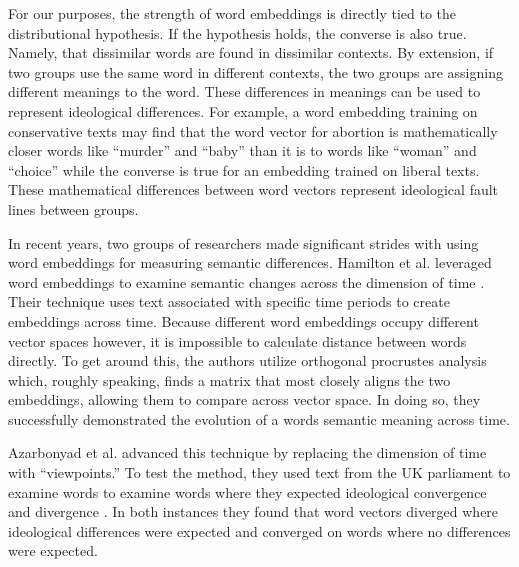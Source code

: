 \documentclass[../embeddings.tex]{subfiles}
\begin{document}
For our purposes, the strength of word embeddings is directly tied to the distributional hypothesis. If the hypothesis holds, the converse is also true. Namely, that dissimilar words are found in dissimilar contexts. By extension, if two groups use the same word in different contexts, the two groups are assigning different meanings to the word. These differences in meanings can be used to represent ideological differences. For example, a word embedding training on conservative texts may find that the word vector for abortion is mathematically closer words like “murder” and “baby” than it is to words like “woman” and “choice” while the converse is true for an embedding trained on liberal texts. These mathematical differences between word vectors represent ideological fault lines between groups.

In recent years, two groups of researchers made significant strides with using word embeddings for measuring semantic differences. Hamilton et al. leveraged word embeddings to examine semantic changes across the dimension of time \cite{hamilton2016diachronic}. Their technique uses text associated with specific time periods to create embeddings across time. Because different word embeddings occupy different vector spaces however, it is impossible to calculate distance between words directly. To get around this, the authors utilize orthogonal procrustes analysis which, roughly speaking, finds a matrix that most closely aligns the two embeddings, allowing them to compare across vector space. In doing so, they successfully demonstrated the evolution of a words semantic meaning across time.

Azarbonyad et al. advanced this technique by replacing the dimension of time with “viewpoints.” To test the method, they used text from the UK parliament to examine words to examine words where they expected ideological convergence and divergence \cite{azarbonyad2017words}. In both instances they found that word vectors diverged where ideological differences were expected and converged on words where no differences were expected.
\end{document}
